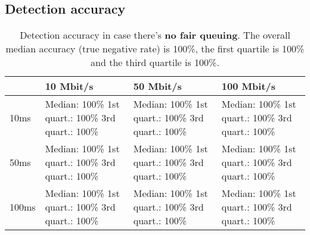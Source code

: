 \documentclass[conference]{IEEEtran}
\begin{document}
\subsection{Detection accuracy}

\begin{table}
\begin{tabularx}{\columnwidth}{| l | X | X | X |}
\hline
& 10 Mbit/s & 50 Mbit/s & 100 Mbit/s \\ \hline
10ms & Median: 100\% \newline 1st quart.: 100\% \newline 3rd quart.: 100\% & Median: 100\% \newline 1st quart.: 100\% \newline 3rd quart.: 100\% & Median: 100\% \newline 1st quart.: 100\% \newline 3rd quart.: 100\%\\ \hline
50ms & Median: 100\% \newline 1st quart.: 100\% \newline 3rd quart.: 100\% & Median: 100\% \newline 1st quart.: 100\% \newline 3rd quart.: 100\% & Median: 100\% \newline 1st quart.: 100\% \newline 3rd quart.: 100\% \\ \hline
100ms & Median: 100\% \newline 1st quart.: 100\% \newline 3rd quart.: 100\% & Median: 100\% \newline 1st quart.: 100\% \newline 3rd quart.: 100\% & Median: 100\% \newline 1st quart.: 100\% \newline 3rd quart.: 100\% \\ \hline
\end{tabularx}
\caption{Detection accuracy in case there's \textbf{no fair queuing}.  The overall median accuracy (true negative rate) is 100\%, the first quartile is 100\% and the third quartile is 100\%.}
\label{table:no_fq}
\end{table}
\end{document}

